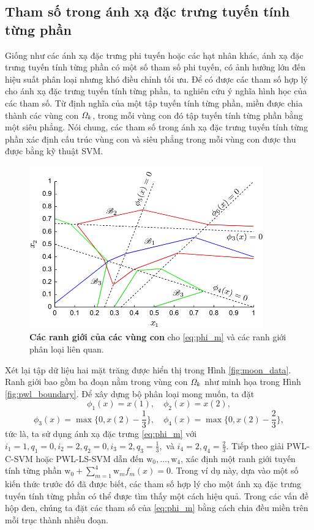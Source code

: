 \subsection{Tham số trong ánh xạ đặc trưng tuyến tính từng phần}
Giống như các ánh xạ đặc trưng phi tuyến hoặc các hạt nhân khác, ánh xạ đặc trưng tuyến tính từng phần có một số tham số phi tuyến, có ảnh hưởng lớn đến hiệu suất phân loại nhưng khó điều chỉnh tối ưu. Để có được các tham số hợp lý cho ánh xạ đặc trưng tuyến tính từng phần, ta nghiên cứu ý nghĩa hình học của các tham số. Từ định nghĩa của một tập tuyến tính từng phần, miền được chia thành các vùng con \(\mathit{\Omega}_k\), trong mỗi vùng con đó tập tuyến tính từng phần bằng một siêu phẳng. Nói chung, các tham số trong ánh xạ đặc trưng tuyến tính từng phần xác định cấu trúc vùng con và siêu phẳng trong mỗi vùng con được thu được bằng kỹ thuật SVM.

\begin{figure}
    \centering
    \includegraphics[width=0.9\textwidth]{images/bound_of_subregions.png}
    \caption[Ranh giới của các vùng con]{\textbf{Các ranh giới của các vùng con} cho \eqref{eq:phi_m} và các ranh giới phân loại liên quan.}
    \label{fig:bound_of_subregions}
\end{figure}

Xét lại tập dữ liệu hai mặt trăng được hiển thị trong Hình \ref{fig:moon_data}. Ranh giới bao gồm ba đoạn nằm trong vùng con \(\mathit{\Omega}_k\) như minh họa trong Hình \ref{fig:pwl_boundary}. Để xây dựng bộ phân loại mong muốn, ta đặt
\[
\phi_1(x) = x(1), \quad \phi_2(x) = x(2),
\]
\[
    \phi_3(x) = \max\{0, x(2) - \frac{1}{3}\}, \quad \phi_4(x) = \max\{0, x(2) - \frac{2}{3}\},
\]
tức là, ta sử dụng ánh xạ đặc trưng \eqref{eq:phi_m} với \(i_1 = 1, q_1 = 0, i_2 = 2, q_2 = 0, i_3 = 2, q_3 = \frac{1}{3},\) và \(i_4 = 2, q_4 = \frac{2}{3}\). Tiếp theo giải PWL-C-SVM hoặc PWL-LS-SVM dẫn đến \(\text{w}_0, \ldots, \text{w}_4\), xác định một ranh giới tuyến tính từng phần
\(
\text{w}_0 + \sum_{m=1}^{4} \text{w}_m f_m(x) = 0.
\)
Trong ví dụ này, dựa vào một số kiến thức trước đó đã được biết, các tham số hợp lý cho một ánh xạ đặc trưng tuyến tính từng phần có thể được tìm thấy một cách hiệu quả. Trong các vấn đề hộp đen, chúng ta đặt các tham số của \eqref{eq:phi_m} bằng cách chia đều miền trên mỗi trục thành nhiều đoạn.

